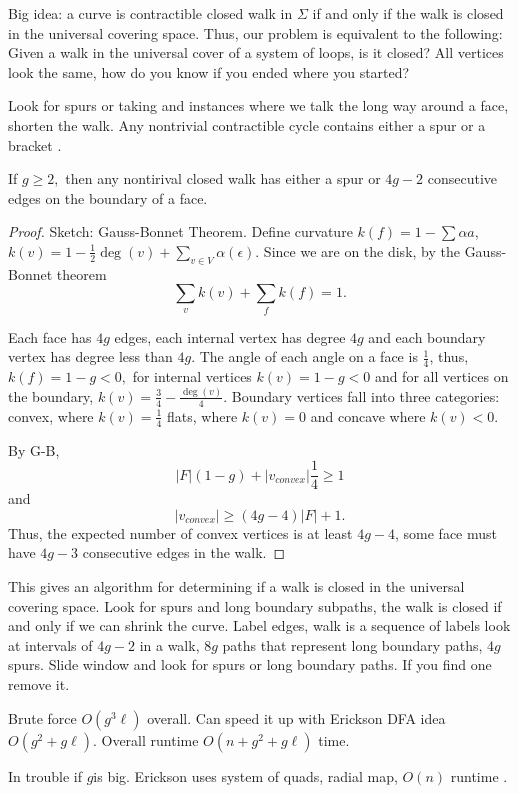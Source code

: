 Big idea: a curve is contractible closed walk in $\Sigma$
if and only if the walk is closed in the universal covering space.
Thus, our problem is equivalent to the following: Given a walk
in the universal cover of a system of loops, is it closed?
All vertices look the same, how do you know if you ended where
you started?

Look for spurs or taking and instances where we talk the long way around a face, 
shorten the walk.
Any nontrivial contractible cycle contains either a spur or a bracket \cite{gertsen-short-1990}.
\begin{lemma}\label{lem:dehn}
If $g\geq 2,$ then any nontirival closed walk has either a spur
or $4g-2$ consecutive edges on the boundary of a face.
\end{lemma}
\begin{proof}
Sketch: Gauss-Bonnet Theorem.
Define curvature $k(f)=1-\sum \alpha{a}$,
$k(v)=1-\frac{1}{2}\deg(v)+\sum_{v\in V} \alpha(\epsilon)$.
Since we are on the disk, by the Gauss-Bonnet theorem
$$\sum_v k(v)+\sum_f k(f) =1.$$

Each face has $4g$ edges, each internal  vertex has degree $4g$
and each  boundary vertex  has degree less than $4g$.
The angle of each angle on a face  is $\frac{1}{4}$,
thus, $k(f)=1-g<0,$ for internal vertices  $k(v)=1-g<0$ and for all
vertices on the boundary, $k(v)=\frac{3}{4}-\frac{\deg(v)}{4}$.
Boundary vertices fall into three  categories: convex, where $k(v)=\frac{1}{4}$
flats,  where $k(v)=0$  and concave where $k(v)<0$.

By G-B, $$|F|(1-g)+|v_{convex}|\frac{1}{4}\geq 1$$
and 
$$|v_{convex}|\geq (4g-4)|F|+1.$$
Thus, the expected number of convex vertices is at least
$4g-4$, some face must have  $4g-3$ consecutive edges in the walk.
\end{proof}

This gives an algorithm for determining if a walk is closed in the universal
covering space.
Look for spurs and long boundary subpaths, the walk is closed if and  only if
we can  shrink the curve.
Label edges, walk is a sequence of labels
look at intervals of $4g-2$ in a walk, $8g$ paths
that represent long boundary paths, $4g$ spurs.
Slide window and look for spurs or long boundary paths.
If you find one remove it.

Brute force $O(g^3\ell)$ overall.
Can speed it up with Erickson DFA  idea
$O(g^2+g\ell)$.
Overall runtime $O(n+g^2+g\ell)$ time.

In trouble if $g$is big. Erickson uses system of quads,
radial map, $O(n)$ runtime  \cite{erickson-whittlesey-2013}.





